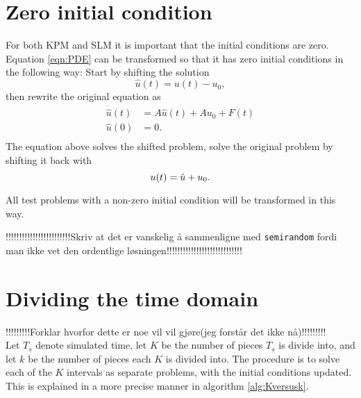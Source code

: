 \section{Zero initial condition}%
For both KPM and SLM it is important that the initial conditions are zero. Equation \eqref{eqn:PDE} can be transformed so that it has zero initial conditions in the following way:
Start by shifting the solution
\begin{equation*}
\hat{u}(t) = u(t)-u_0,
\end{equation*}
then rewrite the original equation as
\begin{equation*}
\begin{aligned}
\dot{\hat{u}}(t) &= A \hat{u}(t) +A u_0 + F(t) \\
 \hat{u}(0)&= 0. \\
\end{aligned}
\end{equation*}
The equation above solves the shifted problem, solve the original problem by shifting it back with
\begin{equation*}
 u(t) = \hat{u} + u_0. \\
\end{equation*}


All test problems with a non-zero initial condition will be transformed in this way.



!!!!!!!!!!!!!!!!!!!!!!!!Skriv at det er vanskelig å sammenligne med \texttt{semirandom} fordi man ikke vet den ordentlige løsningen!!!!!!!!!!!!!!!!!!!!!!!!!!!!\\

\section{Dividing the time domain}%
!!!!!!!!!Forklar hvorfor dette er noe vil vil gjøre(jeg forstår det ikke nå)!!!!!!!!!\\

Let $T_s$ denote simulated time, let $K$ be the number of pieces $T_s$ is divide into, and let $k$ be the number of pieces each $K$ is divided into. The procedure is to solve each of the $K$ intervals as separate problems, with the initial conditions updated. This is explained in a more precise manner in algorithm \ref{alg:Kversusk}.

